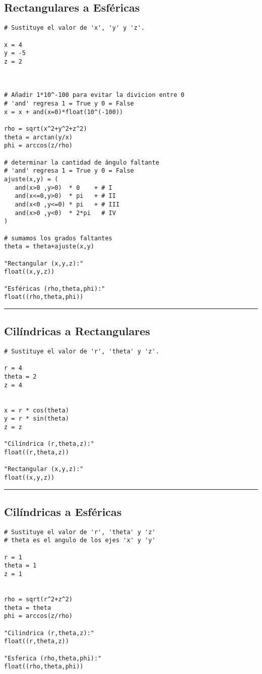 \documentclass{article}
\begin{document}
\subsection{Rectangulares a Esféricas}
\label{sec:orgfefda79}
\begin{verbatim}
# Sustituye el valor de 'x', 'y' y 'z'.

x = 4
y = -5
z = 2



# Añadir 1*10^-100 para evitar la divicion entre 0
# 'and' regresa 1 = True y 0 = False
x = x + and(x=0)*float(10^(-100))

rho = sqrt(x^2+y^2+z^2)
theta = arctan(y/x)
phi = arccos(z/rho)

# determinar la cantidad de ángulo faltante
# 'and' regresa 1 = True y 0 = False
ajuste(x,y) = ( 
   and(x>0 ,y>0)  * 0    + # I
   and(x<=0,y>0)  * pi   + # II
   and(x<0 ,y<=0) * pi   + # III
   and(x>0 ,y<0)  * 2*pi   # IV
)

# sumamos los grados faltantes
theta = theta+ajuste(x,y)

"Rectangular (x,y,z):"
float((x,y,z))

"Esféricas (rho,theta,phi):"
float((rho,theta,phi))
\end{verbatim}

\noindent\rule{\textwidth}{0.5pt}

\newpage 

\subsection{Cilíndricas a Rectangulares}
\label{sec:orgf5e9510}
\begin{verbatim}
# Sustituye el valor de 'r', 'theta' y 'z'.

r = 4
theta = 2
z = 4


x = r * cos(theta)
y = r * sin(theta)
z = z

"Cilíndrica (r,theta,z):"
float((r,theta,z))

"Rectangular (x,y,z):"
float((x,y,z))
\end{verbatim}

\noindent\rule{\textwidth}{0.5pt}

\newpage 

\subsection{Cilíndricas a Esféricas}
\label{sec:orgcb73558}
\begin{verbatim}
# Sustituye el valor de 'r', 'theta' y 'z'
# theta es el angulo de los ejes 'x' y 'y'

r = 1
theta = 1
z = 1


rho = sqrt(r^2+z^2) 
theta = theta
phi = arccos(z/rho)

"Cilindrica (r,theta,z):"
float((r,theta,z))

"Esferica (rho,theta,phi):"
float((rho,theta,phi))
\end{verbatim}
\end{document}
